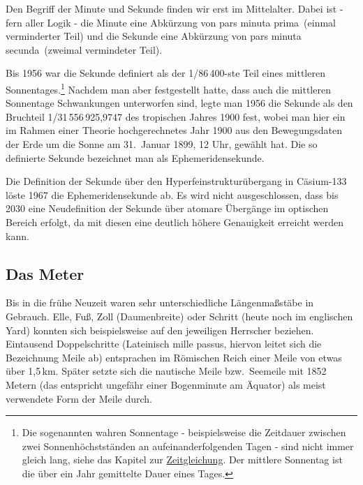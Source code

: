 Den Begriff der Minute und Sekunde finden wir erst im Mittelalter. 
Dabei ist - fern aller Logik - die Minute 
eine Abk\"urzung von \glqq pars minuta prima\grqq\ (einmal verminderter Teil) und die Sekunde eine
Abk\"urzung von \glqq pars minuta secunda\grqq\ (zweimal vermindeter Teil). 

Bis 1956 war die Sekunde definiert als der 1/86\,400-ste Teil eines 
mittleren 
Sonnentages.\footnote{Die sogenannten wahren
Sonnentage - beispielsweise die Zeitdauer zwischen zwei Sonnenh\"ochstst\"anden an aufeinanderfolgenden
Tagen - sind nicht immer gleich lang, siehe das Kapitel zur \hyperref[chap_Zeitgleichung]{Zeitgleichung}.
Der mittlere Sonnentag ist die \"uber ein Jahr gemittelte Dauer eines Tages.} 
Nachdem man aber festgestellt hatte, dass auch die mittleren Sonnentage Schwankungen
unterworfen sind, legte man 1956 die Sekunde als den Bruchteil 1/31\,556\,925,9747
des tropischen Jahres 1900 fest, wobei
man hier ein im Rahmen einer Theorie hochgerechnetes Jahr 1900 aus den Bewegungsdaten der Erde um die
Sonne am 31.\ Januar 1899, 12 Uhr, gew\"ahlt hat. Die so definierte Sekunde bezeichnet man
als Ephemeridensekunde. 

Die Definition der Sekunde \"uber den Hyperfeinstruktur\"ubergang in C\"asium-133 l\"oste 1967 die 
Ephemeridensekunde ab. Es wird nicht ausgeschlossen, dass bis 2030
eine Neudefinition der Sekunde \"uber atomare \"Uberg\"ange im optischen Bereich erfolgt, da mit 
diesen eine deutlich h\"ohere Genauigkeit erreicht werden kann.

\subsection{Das Meter}

Bis in die fr\"uhe Neuzeit waren sehr unterschiedliche L\"angenma\ss st\"abe in Gebrauch. 
Elle, Fu\ss, Zoll (Daumenbreite) oder Schritt (heute noch im englischen Yard) konnten sich 
beispielsweise auf den jeweiligen Herrscher beziehen. Eintausend Doppelschritte (Lateinisch
\glqq mille passus\grqq, hiervon leitet sich die Bezeichnung Meile ab) 
entsprachen im R\"omischen
Reich einer Meile von etwas \"uber 1,5\,km. Sp\"ater setzte sich die nautische Meile bzw.\ Seemeile
mit 1852 Metern (das entspricht ungef\"ahr einer Bogenminute am \"Aquator) als meist verwendete
Form der Meile durch. 

